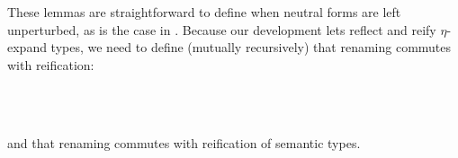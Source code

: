 \documentclass[authoryear, acmsmall, screen, review, nonacm]{acmart}
\begin{document}
These lemmas are straightforward to define when neutral forms are left unperturbed, as is the case in \citet{ChapmanKNW19}. Because our development lets reflect and reify $\eta$-expand types, we need to define (mutually recursively) that renaming commutes with reification:
\begin{code}%
\>[0]%
\>[15]\AgdaSymbol{:}\<%
\\
\>[0][@{}l@{\AgdaIndent{0}}]%
\>[2]%
\>[3796I]\AgdaSymbol{(}\AgdaSpace{}%
\AgdaSymbol{:}\AgdaSpace{}%
\AgdaSpace{}%
\AgdaSpace{}%
\AgdaSymbol{)}\AgdaSpace{}%
\AgdaSymbol{(}\AgdaSpace{}%
\AgdaSymbol{:}\AgdaSpace{}%
\AgdaSpace{}%
\AgdaSpace{}%
\AgdaSymbol{)}\AgdaSpace{}%
\<%
\\
\>[.][@{}l@{}]\<[3796I]%
\>[4]\AgdaSymbol{(}\AgdaSpace{}%
\AgdaSpace{}%
\AgdaSymbol{(}\AgdaSpace{}%
\AgdaSymbol{))}\AgdaSpace{}%
\AgdaSpace{}%
\AgdaSymbol{(}\AgdaSpace{}%
\AgdaSymbol{(}\AgdaSpace{}%
\AgdaSpace{}%
\AgdaSymbol{))}\<%
\end{code}

\Ni and that renaming commutes with reification of semantic types.

\begin{code}%
\>[0]\AgdaSpace{}%
\AgdaSymbol{:}\AgdaSpace{}%
%
\>[3817I]\AgdaSymbol{\{}\AgdaSymbol{\}}\AgdaSpace{}%
\AgdaSymbol{\{}\AgdaSymbol{\}}\AgdaSpace{}%
\AgdaSymbol{\{}\AgdaSymbol{\}}\AgdaSpace{}%
\AgdaSymbol{(}\AgdaSpace{}%
\AgdaSymbol{:}\AgdaSpace{}%
\AgdaSpace{}%
\AgdaSpace{}%
\AgdaMissingDefinition{\AgdaSymbol{)}}\AgdaSpace{}%
\AgdaMissingDefinition{\AgdaSymbol{\{}}\AgdaSpace{}%
\AgdaSpace{}%
\AgdaMissingDefinition{\AgdaSymbol{:}}\AgdaSpace{}%
\AgdaSpace{}%
\AgdaSpace{}%
\AgdaSymbol{\}}\AgdaSpace{}%
\<%
\\
\>[.][@{}l@{}]\<[3817I]%
\>[16]\AgdaSpace{}%
\AgdaSpace{}%
\AgdaSpace{}%
%
\>[27]\AgdaSpace{}%
\AgdaSpace{}%
\AgdaSymbol{(}\AgdaSpace{}%
\AgdaSymbol{)}\AgdaSpace{}%
\AgdaSpace{}%
\AgdaSpace{}%
\AgdaSymbol{(}\AgdaSpace{}%
\AgdaSpace{}%
\AgdaSymbol{)}\<%
\end{code}
\end{document}
